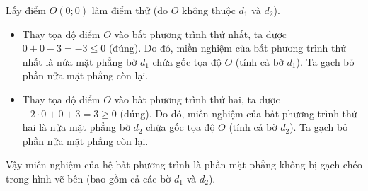 \begin{ex}
{\begin{itemchoice}
\begin{itemize}
			\end{itemize}
			Lấy điểm $O(0; 0)$ làm điểm thử (do $O$ không thuộc $d_1$ và $d_2$).
			\begin{itemize}
				\item Thay tọa độ điểm $O$ vào bất phương trình thứ nhất, ta được $0+0-3=-3 \le 0$ (đúng). Do đó, miền nghiệm của bất phương trình thứ nhất là nửa mặt phẳng bờ $d_1$ chứa gốc tọa độ $O$ (tính cả bờ $d_1$). Ta gạch bỏ phần nửa mặt phẳng còn lại.
				\item Thay tọa độ điểm $O$ vào bất phương trình thứ hai, ta được $-2\cdot0+0+3=3\ge 0$ (đúng). Do đó, miền nghiệm của bất phương trình thứ hai là nửa mặt phẳng bờ $d_2$ chứa gốc tọa độ $O$ (tính cả bờ $d_2$). Ta gạch bỏ phần nửa mặt phẳng còn lại.
			\end{itemize}
			Vậy miền nghiệm của hệ bất phương trình là phần mặt phẳng không bị gạch chéo trong hình vẽ bên (bao gồm cả các bờ $d_1$ và $d_2$).
		\end{itemchoice}
	}
\end{ex}


